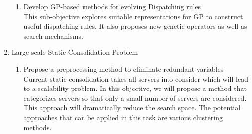 \begin{enumerate}
\begin{enumerate}
		\item Develop GP-based methods for evolving Dispatching rules \\
		This sub-objective explores suitable representations for GP to construct useful dispatching rules. It also proposes new genetic operators as well as search mechanisms.
	\end{enumerate}

	\item Large-scale Static Consolidation Problem
	\begin{enumerate}
		\item Propose a preprocessing method to eliminate redundant variables \\
		Current static consolidation takes all servers into consider which will lead to a scalability problem. In this objective, we will propose a method that categorizes servers so that only a small number of servers are considered. This approach will dramatically reduce the search space. The potential approaches that can be applied in this task are various clustering methods.
	\end{enumerate}
\end{enumerate}


